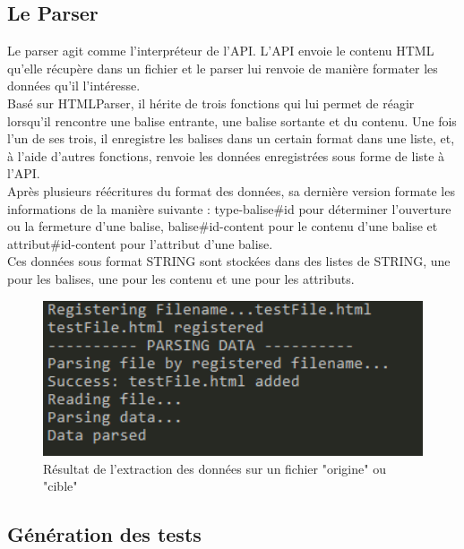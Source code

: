 \subsection{Le Parser}

Le parser agit comme l’interpréteur de l'API. L'API envoie le contenu HTML qu'elle récupère dans un fichier et le parser lui renvoie de manière formater les données qu'il l'intéresse.\\

Basé sur HTMLParser, il hérite de trois fonctions qui lui permet de réagir lorsqu'il rencontre une balise entrante, une balise sortante et du contenu. Une fois l'un de ses trois, il enregistre les balises dans un certain format dans une liste, et, à l'aide d'autres fonctions, renvoie les données enregistrées sous forme de liste à l'API.\\

Après plusieurs réécritures du format des données, sa dernière version formate les informations de la manière suivante : type-balise\#id pour déterminer l'ouverture ou la fermeture d'une balise, balise\#id-content pour le contenu d'une balise et attribut\#id-content pour l'attribut d'une balise.\\

Ces données sous format STRING sont stockées dans des listes de STRING, une pour les balises, une pour les contenu et une pour les attributs.\\

\begin{figure}[ht]
\centering
\includegraphics[width=1\textwidth]{parsing.png}
\caption{\label{fig:parsing}Résultat de l'extraction des données sur un fichier "origine" ou "cible"}
\end{figure}

\subsection{Génération des tests}

